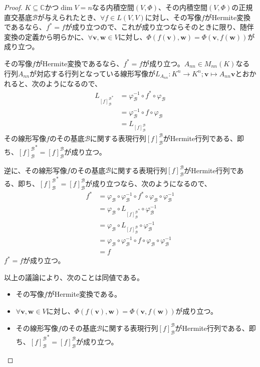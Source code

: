 \documentclass[dvipdfmx]{jsarticle}
\begin{document}
\begin{proof}
$K \subseteq \mathbb{C}$かつ$\dim V = n$なる内積空間$(V,\varPhi)$、その内積空間$(V,\varPhi)$の正規直交基底$\mathcal{B}$が与えられたとき、$\forall f \in L(V,V)$に対し、その写像$f$がHermite変換であるなら、$f^{*} = f$が成り立つので、これが成り立つならそのときに限り、随伴変換の定義から明らかに、$\forall\mathbf{v},\mathbf{w} \in V$に対し、$\varPhi\left( f\left( \mathbf{v} \right),\mathbf{w} \right) = \varPhi\left( \mathbf{v},f\left( \mathbf{w} \right) \right)$が成り立つ。\par
その写像$f$がHermite変換であるなら、$f^{*} = f$が成り立つ。$A_{nn} \in M_{nn}(K)$なる行列$A_{nn}$が対応する行列となっている線形写像が$L_{A_{nn}}:K^{n} \rightarrow K^{n};\mathbf{v} \mapsto A_{nn}\mathbf{v}$とおかれると、次のようになるので、
\begin{align*}
L_{{[ f]_{\mathcal{B}}^{\mathcal{B}}}^{*}} &= \varphi_{\mathcal{B}}^{- 1} \circ f^{*} \circ \varphi_{\mathcal{B}}\\
&= \varphi_{\mathcal{B}}^{- 1} \circ f \circ \varphi_{\mathcal{B}}\\
&= L_{[ f]_{\mathcal{B}}^{\mathcal{B}}}
\end{align*}
その線形写像$f$のその基底$\mathcal{B}$に関する表現行列$[ f]_{\mathcal{B}}^{\mathcal{B}}$がHermite行列である、即ち、${[ f]_{\mathcal{B}}^{\mathcal{B}}}^{*} = [ f]_{\mathcal{B}}^{\mathcal{B}}$が成り立つ。\par
逆に、その線形写像$f$のその基底$\mathcal{B}$に関する表現行列$[ f]_{\mathcal{B}}^{\mathcal{B}}$がHermite行列である、即ち、${[ f]_{\mathcal{B}}^{\mathcal{B}}}^{*} = [ f]_{\mathcal{B}}^{\mathcal{B}}$が成り立つなら、次のようになるので、
\begin{align*}
f^{*} &= \varphi_{\mathcal{B}} \circ \varphi_{\mathcal{B}}^{- 1} \circ f^{*} \circ \varphi_{\mathcal{B}} \circ \varphi_{\mathcal{B}}^{- 1}\\
&= \varphi_{\mathcal{B}} \circ L_{{[ f]_{\mathcal{B}}^{\mathcal{B}}}^{*}} \circ \varphi_{\mathcal{B}}^{- 1}\\
&= \varphi_{\mathcal{B}} \circ L_{[ f]_{\mathcal{B}}^{\mathcal{B}}} \circ \varphi_{\mathcal{B}}^{- 1}\\
&= \varphi_{\mathcal{B}} \circ \varphi_{\mathcal{B}}^{- 1} \circ f \circ \varphi_{\mathcal{B}} \circ \varphi_{\mathcal{B}}^{- 1}\\
&= f
\end{align*}
$f^{*} = f$が成り立つ。\par
以上の議論により、次のことは同値である。
\begin{itemize}
\item
  その写像$f$がHermite変換である。
\item
  $\forall\mathbf{v},\mathbf{w} \in V$に対し、$\varPhi\left( f\left( \mathbf{v} \right),\mathbf{w} \right) = \varPhi\left( \mathbf{v},f\left( \mathbf{w} \right) \right)$が成り立つ。
\item
  その線形写像$f$のその基底$\mathcal{B}$に関する表現行列$[ f]_{\mathcal{B}}^{\mathcal{B}}$がHermite行列である、即ち、${[ f]_{\mathcal{B}}^{\mathcal{B}}}^{*} = [ f]_{\mathcal{B}}^{\mathcal{B}}$が成り立つ。
\end{itemize}
\end{proof}
\end{document}
